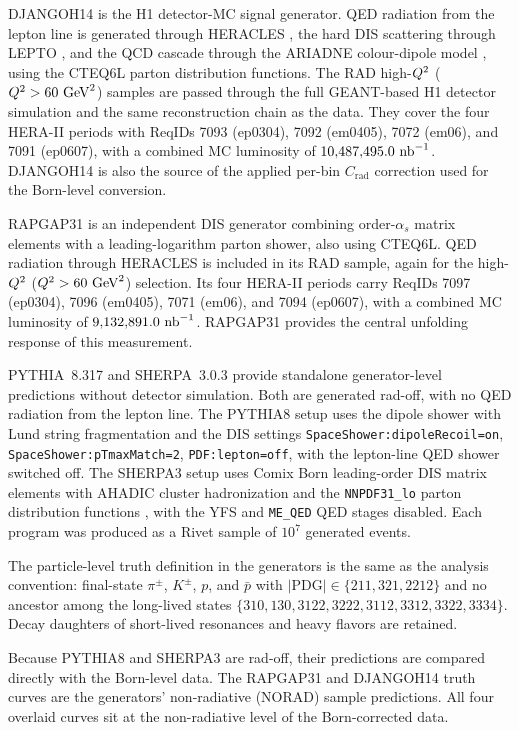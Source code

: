 DJANGOH14 \cite{Charchula:1994kf} is the H1 detector-MC signal generator.  QED
radiation from the lepton line is generated through HERACLES
\cite{Kwiatkowski:1990es}, the hard DIS scattering through LEPTO
\cite{Ingelman:1996mq}, and the QCD cascade through the ARIADNE colour-dipole
model \cite{Lonnblad:1992tz}, using the CTEQ6L parton distribution functions.
The RAD high-$Q^{2}$ ($Q^{2}>60~\text{GeV}^{2}$) samples are passed through the full GEANT-based H1
detector simulation \cite{Brun:1987ma} and the same reconstruction chain as the
data.  They cover the four HERA-II periods with ReqIDs 7093 (ep0304), 7092
(em0405), 7072 (em06), and 7091 (ep0607), with a combined MC luminosity of
$10{,}487{,}495.0~\text{nb}^{-1}$.  DJANGOH14 is also the source of the applied per-bin
$C_{\mathrm{rad}}$ correction used for the Born-level conversion.

RAPGAP31 \cite{Jung:1993gf} is an independent DIS generator combining
order-$\alpha_s$ matrix elements with a leading-logarithm parton shower, also
using CTEQ6L.  QED radiation through HERACLES is included in its RAD sample,
again for the high-$Q^{2}$ ($Q^{2}>60~\text{GeV}^{2}$) selection.  Its four HERA-II periods carry
ReqIDs 7097 (ep0304), 7096 (em0405), 7071 (em06), and 7094 (ep0607), with a
combined MC luminosity of $9{,}132{,}891.0~\text{nb}^{-1}$.  RAPGAP31 provides the
central unfolding response of this measurement.

PYTHIA~8.317 \cite{Sjostrand:2014zea} and SHERPA~3.0.3 \cite{Sherpa:2019gpd}
provide standalone generator-level predictions without detector simulation.
Both are generated rad-off, with no QED radiation from the lepton line.  The
PYTHIA8 setup uses the dipole shower with Lund string fragmentation and the
DIS settings \texttt{SpaceShower:dipoleRecoil=on},
\texttt{SpaceShower:pTmaxMatch=2}, \texttt{PDF:lepton=off}, with the
lepton-line QED shower switched off.  The SHERPA3 setup uses Comix Born
leading-order DIS matrix elements with AHADIC cluster hadronization and the
\texttt{NNPDF31\_lo} parton distribution functions \cite{Ball:2017nwa}, with
the YFS and \texttt{ME\_QED} QED stages disabled.  Each program was produced
as a Rivet sample of $10^{7}$ generated events.

The particle-level truth definition in the generators is the same as the analysis convention: final-state $\pi^{\pm}$, $K^{\pm}$, $p$, and $\bar p$ with
$|\mathrm{PDG}|\in\{211,321,2212\}$ and no ancestor among the long-lived
states $\{310,130,3122,3222,3112,3312,3322,3334\}$. Decay daughters of
short-lived resonances and heavy flavors are retained. 

Because PYTHIA8 and SHERPA3 are rad-off, their predictions are compared
directly with the Born-level data.  The RAPGAP31 and DJANGOH14 truth curves
are the generators' non-radiative (NORAD) sample predictions. All four
overlaid curves sit at the non-radiative level of the Born-corrected data.
